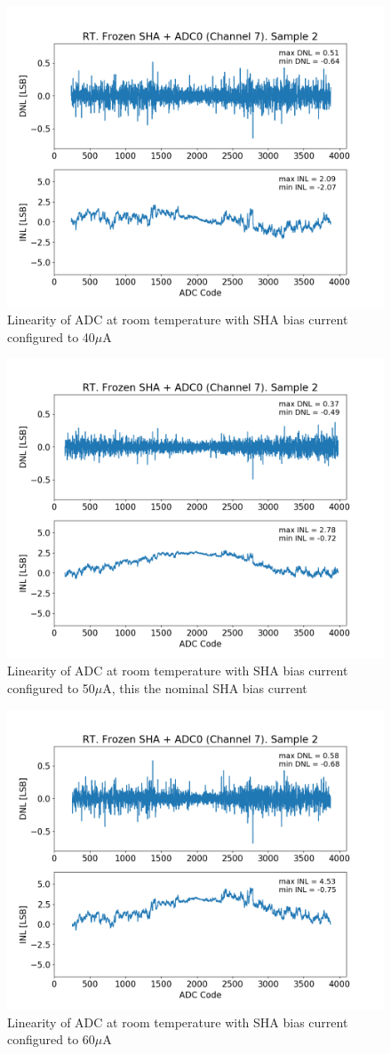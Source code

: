 \begin{figure}[h!]
\centering
  \includegraphics[width=0.7\linewidth]{figures/prakash_fig/linearity_sha_40u.png}
  \caption{Linearity of ADC at room temperature with SHA bias current configured to 40$\mu$A}
  \label{fig:linearity_sha_40u}
\end{figure}
\begin{figure}[h!]
\centering
  \includegraphics[width=0.7\linewidth]{figures/prakash_fig/linearity_sha_50u.png}
  \caption{Linearity of ADC at room temperature with SHA bias current configured to 50$\mu$A, this the nominal SHA bias current}
  \label{fig:linearity_sha_50u}
\end{figure}
\begin{figure}[h!]
\centering
  \includegraphics[width=0.7\linewidth]{figures/prakash_fig/linearity_sha_60u.png}
  \caption{Linearity of ADC at room temperature with SHA bias current configured to 60$\mu$A}
  \label{fig:linearity_sha_60u}
\end{figure}


